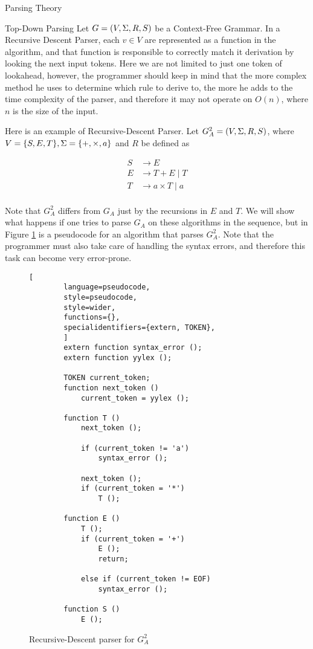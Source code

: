 \begin{section}{Parsing Theory}
\begin{subsection}{Top-Down Parsing}
Let $G = (V, \Sigma, R, S)$ be a Context-Free Grammar. In a Recursive Descent
Parser, each $v \in V$ are represented as a function in the algorithm, and
that function is responsible to correctly match it derivation by looking
the next input tokens. Here we are not limited to just one token of lookahead,
however, the programmer should keep in mind that the more complex method
he uses to determine which rule to derive to, the more he adds to the
time complexity of the parser, and therefore it may not operate on $O(n)$,
where $n$ is the size of the input.

Here is an example of Recursive-Descent Parser. Let $G_A^2 = (V, \Sigma, R, S)$,
where $V = \{S, E, T\}, \Sigma = \{+, \times, a\}$ and $R$ be defined as

\begin{align}
S &\rightarrow E \nonumber \\
E &\rightarrow T + E \; | \; T  \nonumber \\
T &\rightarrow a \times T \; | \; a \nonumber \\
\end{align}

Note that $G_A^2$ differs from $G_A$ just by the recursions in $E$ and $T$.
We will show what happens if one tries to parse $G_A$ on these algorithms
in the sequence, but in Figure \ref{fig:recursive-descent} is a pseudocode for
an algorithm that parses $G_A^2$. Note that the programmer must also take
care of handling the syntax errors, and therefore this task can become
very error-prone.

\begin{figure}[ht]
	\centering
	\begin{lstlisting}[
		language=pseudocode,
		style=pseudocode,
		style=wider,
		functions={},
		specialidentifiers={extern, TOKEN},
		]
		extern function syntax_error ();
		extern function yylex ();

		TOKEN current_token;
		function next_token ()
			current_token = yylex ();

		function T ()
			next_token ();

			if (current_token != 'a')
				syntax_error ();

			next_token ();
			if (current_token = '*')
				T ();

		function E ()
			T ();
			if (current_token = '+')
				E ();
				return;
			
			else if (current_token != EOF)
				syntax_error ();
		
		function S ()
			E ();
	\end{lstlisting}
\caption{Recursive-Descent parser for $G_A^2$}
\label{fig:recursive-descent}
\end{figure}


\end{subsection}
\end{section}
